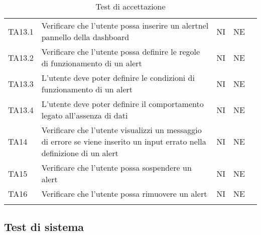 \begin{longtable} {
		>{}p{15mm} 
		>{}p{79.5mm}
		>{}p{15mm} 
		>{}p{15mm}
		>{}p{0mm}}
	TA13.1 & Verificare che l'utente possa inserire un alert\glosp nel pannello della dashboard\glo & NI & NE  &\TBstrut \\ [2mm]
	TA13.2 & Verificare che l'utente possa definire le regole di funzionamento di un alert\glo & NI & NE  &\TBstrut \\ [2mm]
	TA13.3 & L'utente deve poter definire le condizioni di funzionamento di un alert\glo & NI & NE  &\TBstrut \\ [2mm]
	TA13.4 & L'utente deve poter definire il comportamento legato all'assenza di dati  & NI & NE  &\TBstrut \\ [2mm]
	TA14 & Verificare che l'utente visualizzi un messaggio di errore se viene inserito un input errato nella definizione di un alert\glo & NI & NE  &\TBstrut \\ [2mm]
	TA15 & Verificare che l'utente possa sospendere un alert\glo & NI & NE  &\TBstrut \\ [2mm]
	TA16 & Verificare che l'utente possa rimuovere un alert\glo & NI & NE  &\TBstrut \\ [2mm]
	\rowcolor{white}
	\caption{Test di accettazione}
\end{longtable}


\subsection{Test di sistema}

